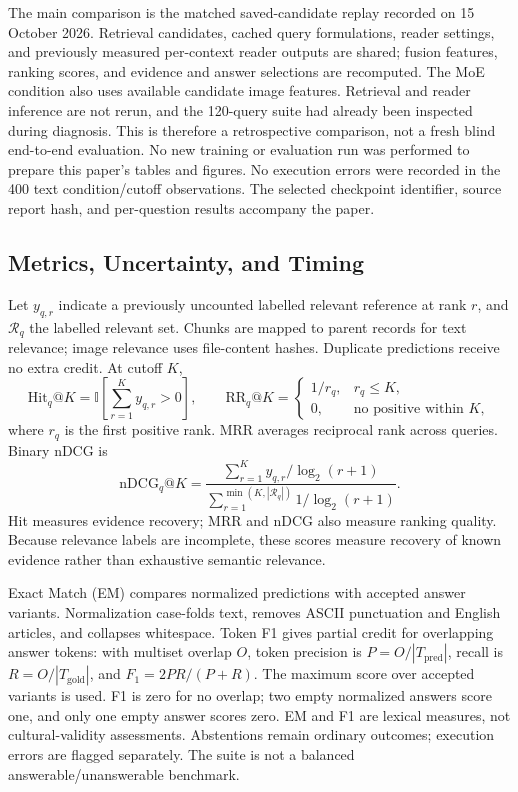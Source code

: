\documentclass[10pt,a4paper]{article}
\newcommand{\ind}{\mathbb{I}}
\begin{document}
The main comparison is the matched saved-candidate replay recorded on 15 October 2026. Retrieval candidates, cached query formulations, reader settings, and previously measured per-context reader outputs are shared; fusion features, ranking scores, and evidence and answer selections are recomputed. The MoE condition also uses available candidate image features. Retrieval and reader inference are not rerun, and the 120-query suite had already been inspected during diagnosis. This is therefore a retrospective comparison, not a fresh blind end-to-end evaluation. No new training or evaluation run was performed to prepare this paper's tables and figures. No execution errors were recorded in the 400 text condition/cutoff observations. The selected checkpoint identifier, source report hash, and per-question results accompany the paper.

\subsection{Metrics, Uncertainty, and Timing}
Let $y_{q,r}$ indicate a previously uncounted labelled relevant reference at rank $r$, and $\mathcal R_q$ the labelled relevant set. Chunks are mapped to parent records for text relevance; image relevance uses file-content hashes. Duplicate predictions receive no extra credit. At cutoff $K$,
\begin{equation}
\mathrm{Hit}_q@K=\ind\!\left[\sum_{r=1}^K y_{q,r}>0\right],\qquad
\mathrm{RR}_q@K=\begin{cases}1/r_q,&r_q\leq K,\\0,&\text{no positive within }K,\end{cases}
\end{equation}
where $r_q$ is the first positive rank. MRR averages reciprocal rank across queries. Binary nDCG is
\begin{equation}
\mathrm{nDCG}_q@K=\frac{\sum_{r=1}^K y_{q,r}/\log_2(r+1)}
{\sum_{r=1}^{\min(K,|\mathcal R_q|)}1/\log_2(r+1)}.
\end{equation}
Hit measures evidence recovery; MRR and nDCG also measure ranking quality. Because relevance labels are incomplete, these scores measure recovery of known evidence rather than exhaustive semantic relevance.

Exact Match (EM) compares normalized predictions with accepted answer variants. Normalization case-folds text, removes ASCII punctuation and English articles, and collapses whitespace. Token F1 gives partial credit for overlapping answer tokens: with multiset overlap $O$, token precision is $P=O/|T_{\mathrm{pred}}|$, recall is $R=O/|T_{\mathrm{gold}}|$, and $F_1=2PR/(P+R)$. The maximum score over accepted variants is used. F1 is zero for no overlap; two empty normalized answers score one, and only one empty answer scores zero. EM and F1 are lexical measures, not cultural-validity assessments. Abstentions remain ordinary outcomes; execution errors are flagged separately. The suite is not a balanced answerable/unanswerable benchmark.
\end{document}
